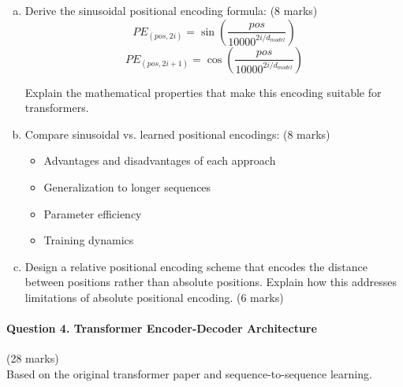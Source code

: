 \documentclass[12pt]{article}
\newcommand{\mediumanswer}{\vspace{3cm}}
\begin{document}
\begin{enumerate}[(a)]
    \item Derive the sinusoidal positional encoding formula: \hfill (8 marks)
    $$PE_{(pos, 2i)} = \sin\left(\frac{pos}{10000^{2i/d_{model}}}\right)$$
    $$PE_{(pos, 2i+1)} = \cos\left(\frac{pos}{10000^{2i/d_{model}}}\right)$$
    
    Explain the mathematical properties that make this encoding suitable for transformers.
    
    \mediumanswer
    
    \item Compare sinusoidal vs. learned positional encodings: \hfill (8 marks)
    \begin{itemize}
        \item Advantages and disadvantages of each approach
        \item Generalization to longer sequences
        \item Parameter efficiency
        \item Training dynamics
    \end{itemize}
    
    \mediumanswer
    
    \item Design a relative positional encoding scheme that encodes the distance between positions rather than absolute positions. Explain how this addresses limitations of absolute positional encoding. \hfill (6 marks)
    
    \mediumanswer
\end{enumerate}

\newpage
\paragraph{Question 4. Transformer Encoder-Decoder Architecture}\hfill (28 marks)\\
Based on the original transformer paper and sequence-to-sequence learning.
\end{document}
